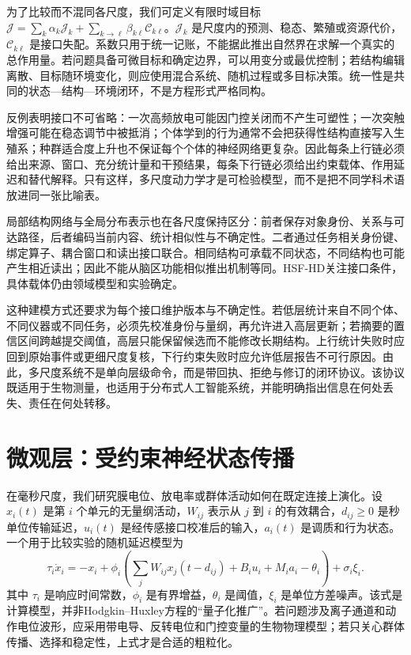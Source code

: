 为了比较而不混同各尺度，我们可定义有限时域目标 $\mathcal J=\sum_k\alpha_k\mathcal J_k+\sum_{k\to\ell}\beta_{k\ell}\mathcal C_{k\ell}$。$\mathcal J_k$ 是尺度内的预测、稳态、繁殖或资源代价，$\mathcal C_{k\ell}$ 是接口失配。系数只用于统一记账，不能据此推出自然界在求解一个真实的总作用量。若问题具备可微目标和确定边界，可以用变分或最优控制；若结构编辑离散、目标随环境变化，则应使用混合系统、随机过程或多目标决策。统一性是共同的状态—结构—环境闭环，不是方程形式严格同构。

反例表明接口不可省略：一次高频放电可能因门控关闭而不产生可塑性；一次突触增强可能在稳态调节中被抵消；个体学到的行为通常不会把获得性结构直接写入生殖系；种群适合度上升也不保证每个个体的神经网络更复杂。因此每条上行链必须给出来源、窗口、充分统计量和干预结果，每条下行链必须给出约束载体、作用延迟和替代解释。只有这样，多尺度动力学才是可检验模型，而不是把不同学科术语放进同一张比喻表。

局部结构网络与全局分布表示也在各尺度保持区分：前者保存对象身份、关系与可达路径，后者编码当前内容、统计相似性与不确定性。二者通过任务相关身份键、绑定算子、耦合窗口和读出接口联合。相同结构可承载不同状态，不同结构也可能产生相近读出；因此不能从脑区功能相似推出机制等同。HSF-HD关注接口条件，具体载体仍由领域模型和实验确定。

这种建模方式还要求为每个接口维护版本与不确定性。若低层统计来自不同个体、不同仪器或不同任务，必须先校准身份与量纲，再允许进入高层更新；若摘要的置信区间跨越提交阈值，高层只能保留候选而不能修改长期结构。上行统计失败时应回到原始事件或更细尺度复核，下行约束失败时应允许低层报告不可行原因。由此，多尺度系统不是单向层级命令，而是带回执、拒绝与修订的闭环协议。该协议既适用于生物测量，也适用于分布式人工智能系统，并能明确指出信息在何处丢失、责任在何处转移。

\section{微观层：受约束神经状态传播}
\label{sec:micro_neural_field_dynamics}

在毫秒尺度，我们研究膜电位、放电率或群体活动如何在既定连接上演化。设 $x_i(t)$ 是第 $i$ 个单元的无量纲活动，$W_{ij}$ 表示从 $j$ 到 $i$ 的有效耦合，$d_{ij}\ge0$ 是秒单位传输延迟，$u_i(t)$ 是经传感接口校准后的输入，$a_i(t)$ 是调质和行为状态。一个用于比较实验的随机延迟模型为
\begin{equation}
 \tau_i\dot x_i=-x_i+\phi_i\!\left(\sum_jW_{ij}x_j(t-d_{ij})+B_iu_i+M_ia_i-\theta_i\right)+\sigma_i\xi_i.
\end{equation}
其中 $\tau_i$ 是响应时间常数，$\phi_i$ 是有界增益，$\theta_i$ 是阈值，$\xi_i$ 是单位方差噪声。该式是计算模型，并非Hodgkin--Huxley方程的“量子化推广”。若问题涉及离子通道和动作电位波形，应采用带电导、反转电位和门控变量的生物物理模型；若只关心群体传播、选择和稳定性，上式才是合适的粗粒化。

